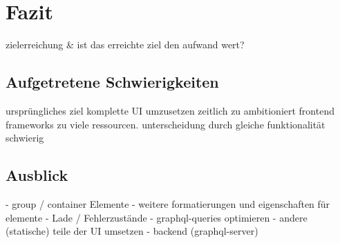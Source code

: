 \chapter{Fazit}\label{chap:conclusion}
zielerreichung \& ist das erreichte ziel den aufwand wert?

\section{Aufgetretene Schwierigkeiten}
ursprüngliches ziel komplette UI umzusetzen zeitlich zu ambitioniert
frontend frameworks zu viele ressourcen. unterscheidung durch gleiche funktionalität schwierig

\section{Ausblick}
- group / container Elemente
- weitere formatierungen und eigenschaften für elemente
- Lade / Fehlerzustände
- graphql-queries optimieren
- andere (statische) teile der UI umsetzen
- backend (graphql-server)
